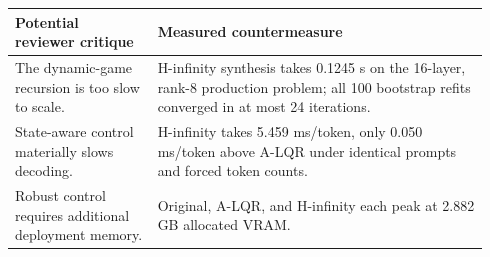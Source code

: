 \begin{tabular}{p{0.29\linewidth}p{0.65\linewidth}}
\toprule
Potential reviewer critique & Measured countermeasure \\
\midrule
The dynamic-game recursion is too slow to scale. & H-infinity synthesis takes 0.1245 s on the 16-layer, rank-8 production problem; all 100 bootstrap refits converged in at most 24 iterations. \\
State-aware control materially slows decoding. & H-infinity takes 5.459 ms/token, only 0.050 ms/token above A-LQR under identical prompts and forced token counts. \\
Robust control requires additional deployment memory. & Original, A-LQR, and H-infinity each peak at 2.882 GB allocated VRAM. \\
\bottomrule
\end{tabular}
